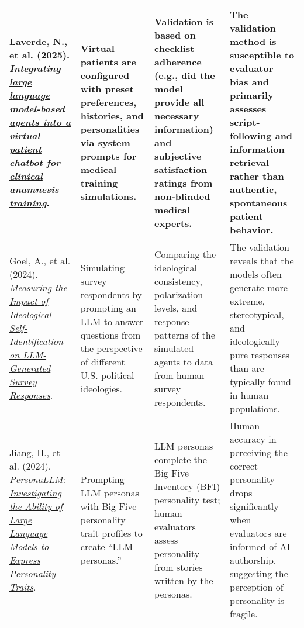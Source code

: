 {\begin{longtable}{| L{4.5cm} | L{3.5cm} | L{3.5cm} | L{3.5cm} |}
\\\hline
Laverde, N., et al. (2025). \href{https://doi.org/10.1016/j.csbj.2025.05.025}{\textit{Integrating large language model-based agents into a virtual patient chatbot for clinical anamnesis training}}. & Virtual patients are configured with preset preferences, histories, and personalities via system prompts for medical training simulations. & Validation is based on checklist adherence (e.g., did the model provide all necessary information) and subjective satisfaction ratings from non-blinded medical experts. & The validation method is susceptible to evaluator bias and primarily assesses script-following and information retrieval rather than authentic, spontaneous patient behavior.
\\\hline
Goel, A., et al. (2024). \href{https://dl.acm.org/doi/10.1145/3613904.3642118}{\textit{Measuring the Impact of Ideological Self-Identification on LLM-Generated Survey Responses}}. & Simulating survey respondents by prompting an LLM to answer questions from the perspective of different U.S. political ideologies. & Comparing the ideological consistency, polarization levels, and response patterns of the simulated agents to data from human survey respondents. & The validation reveals that the models often generate more extreme, stereotypical, and ideologically pure responses than are typically found in human populations.
\\\hline
Jiang, H., et al. (2024). \href{https://aclanthology.org/2024.findings-naacl.229/}{\textit{PersonaLLM: Investigating the Ability of Large Language Models to Express Personality Traits}}. & Prompting LLM personas with Big Five personality trait profiles to create ``LLM personas.'' & LLM personas complete the Big Five Inventory (BFI) personality test; human evaluators assess personality from stories written by the personas. & Human accuracy in perceiving the correct personality drops significantly when evaluators are informed of AI authorship, suggesting the perception of personality is fragile.
\\\hline

\end{longtable}
} %